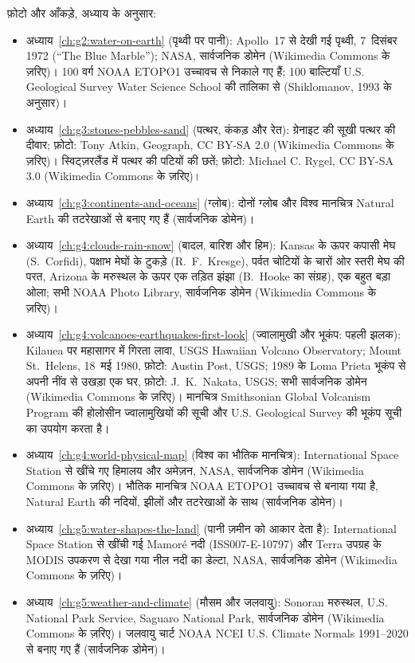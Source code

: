 \bigskip
\noindent फ़ोटो और आँकड़े, अध्याय के अनुसार:
\begin{itemize}\small\setlength{\emergencystretch}{2em}
  \item अध्याय~\ref{ch:g2:water-on-earth} (पृथ्वी पर पानी): Apollo~17 से देखी गई पृथ्वी, 7~दिसंबर 1972 (``The Blue Marble''); NASA, सार्वजनिक डोमेन (Wikimedia Commons के ज़रिए)। 100 वर्ग NOAA ETOPO1 उच्चावच से निकाले गए हैं; 100 बाल्टियाँ U.S. Geological Survey Water Science School की तालिका से (Shiklomanov, 1993 के अनुसार)।
  \item अध्याय~\ref{ch:g3:stones-pebbles-sand} (पत्थर, कंकड़ और रेत): ग्रेनाइट की सूखी पत्थर की दीवार; फ़ोटो: Tony Atkin, Geograph, CC BY-SA 2.0 (Wikimedia Commons के ज़रिए)। स्विट्ज़रलैंड में पत्थर की पटियों की छतें; फ़ोटो: Michael C. Rygel, CC BY-SA 3.0 (Wikimedia Commons के ज़रिए)।
  \item अध्याय~\ref{ch:g3:continents-and-oceans} (ग्लोब): दोनों ग्लोब और विश्व मानचित्र Natural Earth की तटरेखाओं से बनाए गए हैं (सार्वजनिक डोमेन)।
  \item अध्याय~\ref{ch:g4:clouds-rain-snow} (बादल, बारिश और हिम): Kansas के ऊपर कपासी मेघ (S.~Corfidi), पक्षाभ मेघों के टुकड़े (R.~F.~Kresge), पर्वत चोटियों के चारों ओर स्तरी मेघ की परत, Arizona के मरुस्थल के ऊपर एक तड़ित झंझा (B.~Hooke का संग्रह), एक बहुत बड़ा ओला; सभी NOAA Photo Library, सार्वजनिक डोमेन (Wikimedia Commons के ज़रिए)।
  \item अध्याय~\ref{ch:g4:volcanoes-earthquakes-first-look} (ज्वालामुखी और भूकंप: पहली झलक): Kilauea पर महासागर में गिरता लावा, USGS Hawaiian Volcano Observatory; Mount St.~Helens, 18~मई 1980, फ़ोटो: Austin Post, USGS; 1989 के Loma Prieta भूकंप से अपनी नींव से उखड़ा एक घर, फ़ोटो: J.~K.~Nakata, USGS; सभी सार्वजनिक डोमेन (Wikimedia Commons के ज़रिए)। मानचित्र Smithsonian Global Volcanism Program की होलोसीन ज्वालामुखियों की सूची और U.S. Geological Survey की भूकंप सूची का उपयोग करता है।
  \item अध्याय~\ref{ch:g4:world-physical-map} (विश्व का भौतिक मानचित्र): International Space Station से खींचे गए हिमालय और अमेज़न, NASA, सार्वजनिक डोमेन (Wikimedia Commons के ज़रिए)। भौतिक मानचित्र NOAA ETOPO1 उच्चावच से बनाया गया है, Natural Earth की नदियों, झीलों और तटरेखाओं के साथ (सार्वजनिक डोमेन)।
  \item अध्याय~\ref{ch:g5:water-shapes-the-land} (पानी ज़मीन को आकार देता है): International Space Station से खींची गई Mamoré नदी (ISS007-E-10797) और Terra उपग्रह के MODIS उपकरण से देखा गया नील नदी का डेल्टा, NASA, सार्वजनिक डोमेन (Wikimedia Commons के ज़रिए)।
  \item अध्याय~\ref{ch:g5:weather-and-climate} (मौसम और जलवायु): Sonoran मरुस्थल, U.S. National Park Service, Saguaro National Park, सार्वजनिक डोमेन (Wikimedia Commons के ज़रिए)। जलवायु चार्ट NOAA NCEI U.S. Climate Normals 1991--2020 से बनाए गए हैं (सार्वजनिक डोमेन)।

\end{itemize}
